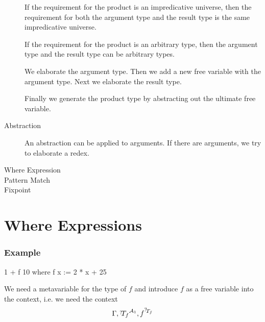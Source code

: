 \begin{description}
    If the requirement for the product is an impredicative universe, then the
    requirement for both the argument type and the result type is the same
    impredicative universe.

    If the requirement for the product is an arbitrary type, then the argument
    type and the result type can be arbitrary types.

    We elaborate the argument type. Then we add a new free variable with the
    argument type. Next we elaborate the result type.

    Finally we generate the product type by abstracting out the ultimate free
    variable.


\item [Abstraction] An abstraction can be applied to arguments. If there are
    arguments, we try to elaborate a redex.

    \begin{comment}
        blalbkakljdalk dlskj
    \end{comment}



\item [Where Expression]

\item [Pattern Match]

\item [Fixpoint]

\end{description}











\section{Where Expressions}


\subsubsection{Example}

\begin{alba}
    1 + f 10
    where
        f x := 2 * x + 25
\end{alba}

We need a metavariable for the type of $f$ and introduce $f$ as a free variable
into the context, i.e. we need the context
$$
    \Gamma, {\meta{T}_f}^{\Any_1}, f^{\meta{T}_f}
$$

